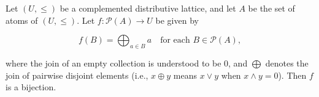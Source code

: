 Let $(U, \leq)$ be a complemented distributive lattice, and let $A$ be the set of atoms of $(U, \leq)$. Let $f: \mathcal{P}(A) \rightarrow U$ be given by

$$f(B) = \bigoplus_{a \in B} a \quad \text{for each } B \in \mathcal{P}(A),$$

where the join of an empty collection is understood to be $0$, and $\bigoplus$ denotes the join of pairwise disjoint elements (i.e., $x \oplus y$ means $x \vee y$ when $x \wedge y = 0$). Then $f$ is a bijection.
